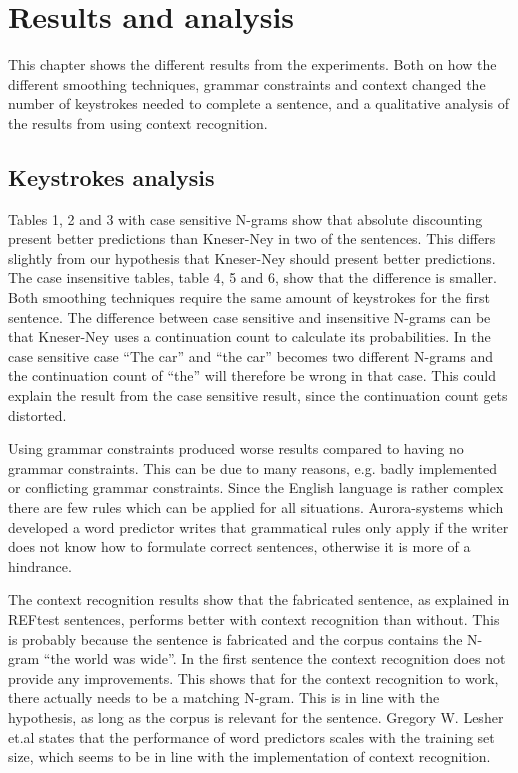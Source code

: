 \section{Results and analysis}
This chapter shows the different results from the experiments. Both on how the different smoothing techniques, grammar constraints and context changed the number of keystrokes needed to complete a sentence, and a qualitative analysis of the results from using context recognition.

\subsection{Keystrokes analysis}
Tables 1, 2 and 3 with case sensitive N-grams show that absolute discounting present better predictions than Kneser-Ney in two of the sentences. This differs slightly from our hypothesis that Kneser-Ney should present better predictions. The case insensitive tables, table 4, 5 and 6, show that the difference is smaller. Both smoothing techniques require the same amount of keystrokes for the first sentence. The difference between case sensitive and insensitive N-grams can be that Kneser-Ney uses a continuation count to calculate its probabilities. In the case sensitive case “The car” and “the car” becomes two different N-grams and the continuation count of “the” will therefore be wrong in that case. This could explain the result from the case sensitive result, since the continuation count gets distorted.

Using grammar constraints produced worse results compared to having no grammar constraints. This can be due to many reasons, e.g. badly implemented or conflicting grammar constraints. Since the English language is rather complex there are few rules which can be applied for all situations. Aurora-systems which developed a word predictor writes that grammatical rules only apply if the writer does not know how to formulate correct sentences, otherwise it is more of a hindrance\cite{aurora}.

The context recognition results show that the fabricated sentence, as explained in REFtest sentences, performs better with context recognition than without. This is probably because the sentence is fabricated and the corpus contains the N-gram “the world was wide”. In the first sentence the context recognition does not provide any improvements. This shows that for the context recognition to work, there actually needs to be a matching N-gram. This is in line with the hypothesis, as long as the corpus is relevant for the sentence. Gregory W. Lesher et.al states that the performance of word predictors scales with the training set size\cite{Lesher99effectsof}, which seems to be in line with the implementation of context recognition.
\vspace{1em}
